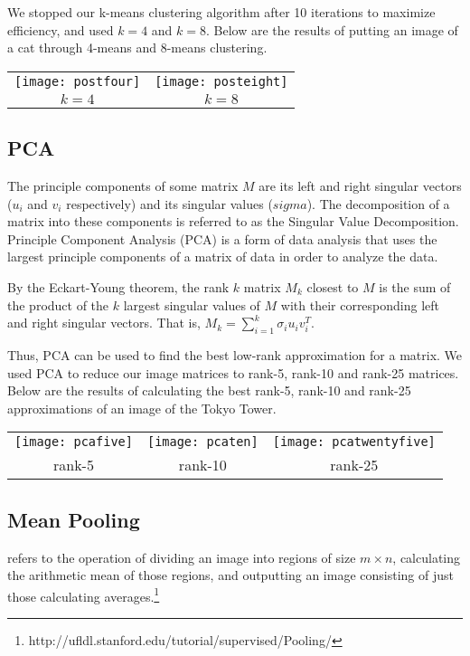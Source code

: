 \documentclass[letterpaper, 10 pt, conference]{ieeeconf}  %
\begin{document}
We stopped our k-means clustering algorithm after 10 iterations
to maximize efficiency, and used $k=4$ and $k=8$. Below are
the results of putting an image of a cat through 4-means and 8-means
clustering.

\vspace*{3mm}
\begin{tabular}{c c}
	\texttt{[image: postfour]} & 
		\texttt{[image: posteight]} \\
	$k=4$ & $k=8$ \\
\end{tabular}

\subsection{PCA} 
The principle components of some matrix $M$ are its left and right singular vectors
($u_i$ and $v_i$ respectively) and its singular values ($sigma$). The decomposition
of a matrix into these components is referred to as the Singular Value Decomposition.
Principle Component Analysis (PCA) is a form of data analysis that uses
the largest principle components of a matrix of data in order to analyze the data.

By the Eckart-Young theorem, the rank $k$ matrix $M_k$ closest
to $M$ is the sum of the product of the $k$ largest singular values of $M$
with their corresponding left and right singular vectors. That is,
$M_k = \sum_{i=1}^k \sigma_i u_i v_i^T$.

Thus, PCA can be used to find the best low-rank approximation for a matrix.
We used PCA to reduce our image matrices to rank-5, rank-10 and rank-25 matrices.
Below are the results of calculating the best rank-5, rank-10 and rank-25
approximations of an image of the Tokyo Tower.

\vspace*{3mm}
\begin{tabular}{c c c}
	\texttt{[image: pcafive]} &
		\texttt{[image: pcaten]} &
		\texttt{[image: pcatwentyfive]} \\ 
	rank-5 & rank-10 & rank-25 \\
\end{tabular}

\subsection{Mean Pooling}
 refers to the operation of dividing
an image into regions of size $m \times n$, calculating
the arithmetic mean of those regions, and outputting
an image consisting of just those calculating averages.\footnote{http://ufldl.stanford.edu/tutorial/supervised/Pooling/}
\end{document}
